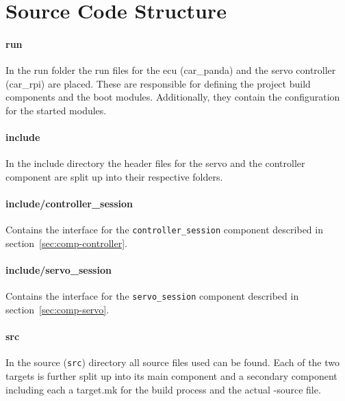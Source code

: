 \newpage

\section{Source Code Structure}



\paragraph{run}
In the run folder the run files for the ecu (car\_panda) and the servo controller (car\_rpi) are placed.
These are responsible for defining the project build components and the boot modules. Additionally, they contain the configuration for the started modules.

\paragraph{include}
In the include directory the header files for the servo and the controller component are split up into their respective folders.

\paragraph{include/controller\_session}
Contains the interface for the \texttt{controller\_session} component described in section~\ref{sec:comp-controller}.

\paragraph{include/servo\_session}
Contains the interface for the \texttt{servo\_session} component described in section~\ref{sec:comp-servo}.

\paragraph{src}
In the source (\texttt{src}) directory all source files used can be found.
Each of the two targets is further split up into its main component and a secondary component including each a target.mk for the build process and the actual \CC-source file.

